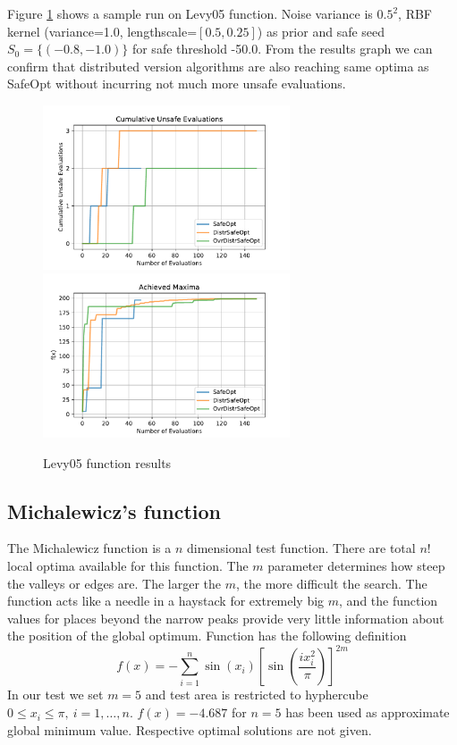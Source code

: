 Figure \ref{fig:levy05-result} shows a sample run on Levy05 function. Noise variance is $0.5^2$, RBF kernel (variance=1.0, lengthscale=$[0.5, 0.25]$) as prior and safe seed $S_0=\{ (-0.8, -1.0) \}$ for safe threshold -50.0. From the results graph we can confirm that distributed version algorithms are also reaching same optima as SafeOpt without incurring not much more unsafe evaluations.
\begin{figure}[H]
	\centering
	\includegraphics[width=0.65\textwidth]{figures/results/levy05-cum-unsafe.pdf}
	\includegraphics[width=0.65\textwidth]{figures/results/levy05-maxima.pdf}
	\caption{Levy05 function results}
	\label{fig:levy05-result}
\end{figure}

\subsection{Michalewicz's function}
The Michalewicz function is a $n$ dimensional test function. There are total $n!$ local optima available for this function.
The $m$ parameter determines how steep the valleys or edges are. The larger the $m$, the more difficult the search. The function acts like a needle in a haystack for extremely big $m$, and the function values for places beyond the narrow peaks provide very little information about the position of the global optimum.
Function has the following definition
$$ f(x) = -\sum_{i=1}^{n}\sin(x_i) \left[ \sin(\frac{ix_i^2}{\pi}) \right]^{2m}  $$
In our test we set $m=5$ and test area is restricted to hyphercube $0 \leq x_i \leq \pi,\ i = 1, \dots, n$. $f(x)=-4.687$ for $n=5$ has been used as approximate global minimum value. Respective optimal solutions are not given.

